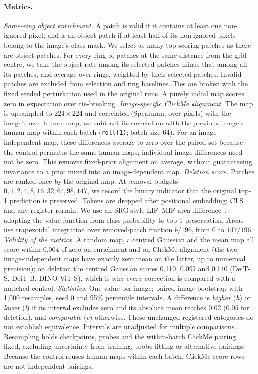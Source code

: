 \paragraph{Metrics.} \emph{Same-ring object enrichment.} A patch is valid if it contains at least one non-ignored pixel, and is an object patch if at least half of its non-ignored pixels belong to the image's class mask. We select as many top-scoring patches as there are object patches. For every ring of patches at the same distance from the grid centre, we take the object rate among its selected patches minus that among all its patches, and average over rings, weighted by their selected patches. Invalid patches are excluded from selection and ring baselines. Ties are broken with the fixed seeded perturbation used in the original runs. A purely radial map scores zero in expectation over tie-breaking.
\emph{Image-specific ClickMe alignment.} The map is upsampled to $224{\times}224$ and correlated (Spearman, over pixels) with the image's own human map; we subtract its correlation with the previous image's human map within each batch (\texttt{roll(1)}; batch size 64). For an image-independent map, these differences average to zero over the paired set because the control permutes the same human maps; individual-image differences need not be zero. This removes fixed-prior alignment on average, without guaranteeing invariance to a prior mixed into an image-dependent map.
\emph{Deletion score.} Patches are ranked once by the original map. At removal budgets $0,1,2,4,8,16,32,64,98,147$, we record the binary indicator that the original top-1 prediction is preserved. Tokens are dropped after positional embedding; CLS and any register remain. We use an SRG-style LIF--MIF area difference~\citep{bluecher2024}, adapting the value function from class probability to top-1 preservation. Areas use trapezoidal integration over removed-patch fraction $b/196$, from 0 to $147/196$.
\emph{Validity of the metrics.} A random map, a centred Gaussian and the mean map all score within 0.004 of zero on enrichment and on ClickMe alignment (the two image-independent maps have exactly zero mean on the latter, up to numerical precision); on deletion the centred Gaussian scores 0.110, 0.099 and 0.140 (DeiT-S, DeiT-B, DINO ViT-S), which is why every correction is compared with a matched control.
\emph{Statistics.} One value per image; paired image-bootstrap with 1,000 resamples, seed 0 and 95\% percentile intervals. A difference is \emph{higher} (\textit{h}) or \emph{lower} (\textit{l}) if its interval excludes zero and its absolute mean reaches 0.02 (0.05 for deletion), and \emph{comparable} (\textit{c}) otherwise. These unchanged registered categories do not establish equivalence. Intervals are unadjusted for multiple comparisons. Resampling holds checkpoints, probes and the within-batch ClickMe pairing fixed, excluding uncertainty from training, probe fitting or alternative pairings. Because the control reuses human maps within each batch, ClickMe score rows are not independent pairings.


